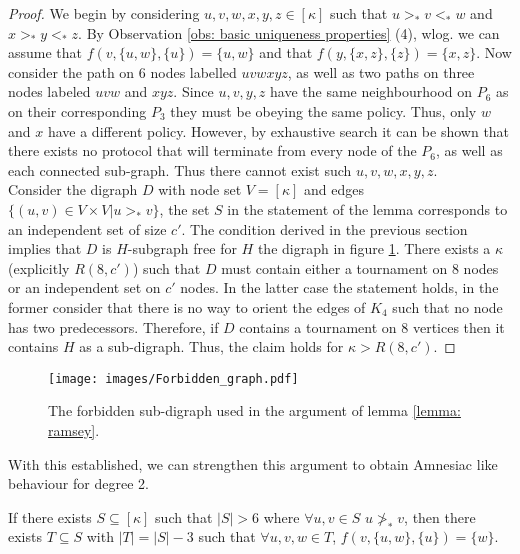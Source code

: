 \begin{proof}
    We begin by considering $u,v,w,x,y,z \in [\kappa]$ such that $u>_*v<_*w$ and $x>_*y<_*z$. By  Observation \ref{obs: basic uniqueness properties} (4), wlog. we can assume that $f(v,\{u,w\},\{u\})=\{u,w\}$ and that $f(y,\{x,z\},\{z\})=\{x,z\}$. Now consider the path on 6 nodes labelled $uvwxyz$, as well as two paths on three nodes labeled $uvw$ and $xyz$. Since $u,v,y,z$ have the same neighbourhood on $P_6$ as on their corresponding $P_3$ they must be obeying the same policy. Thus, only $w$ and $x$ have a different policy. However, by exhaustive search it can be shown that there exists no protocol that will terminate from every node of the $P_6$, as well as each connected sub-graph. Thus there cannot exist such $u,v,w,x,y,z$. \\

    Consider the digraph $D$ with node set $V=[\kappa]$ and edges $\{(u,v)\in V\times V|u>_*v\}$, the set $S$ in the statement of the lemma corresponds to an independent set of size $c'$. The condition derived in the previous section implies that $D$ is $H$-subgraph free for $H$ the digraph in figure \ref{fig: ramsey}. There exists a $\kappa$ (explicitly $R(8,c')$) such that $D$ must contain either a tournament on $8$ nodes or an independent set on $c'$ nodes. In the latter case the statement holds, in the former consider that there is no way to orient the edges of $K_4$ such that no node has two predecessors. Therefore, if $D$ contains a tournament on $8$ vertices then it contains $H$ as a sub-digraph. Thus, the claim holds for $\kappa>R(8,c')$.
\end{proof}
\begin{figure}
    \centering
    \texttt{[image: images/Forbidden\_graph.pdf]}
    \caption{The forbidden sub-digraph used in the argument of lemma \ref{lemma: ramsey}.}
    \label{fig: ramsey}
\end{figure}
With this established, we can strengthen this argument to obtain Amnesiac like behaviour for degree 2.
\begin{lemma}
    \label{lemma:degree 2}
    If there exists $S\subseteq [\kappa]$ such that $|S|>6$ where $\forall u,v \in S$ $u\not>_*v$, then there exists $T\subseteq S$ with $|T|=|S|-3$ such that $\forall u,v,w \in T$, $f(v, \{u,w\},\{u\})=\{w\}$.
\end{lemma}

